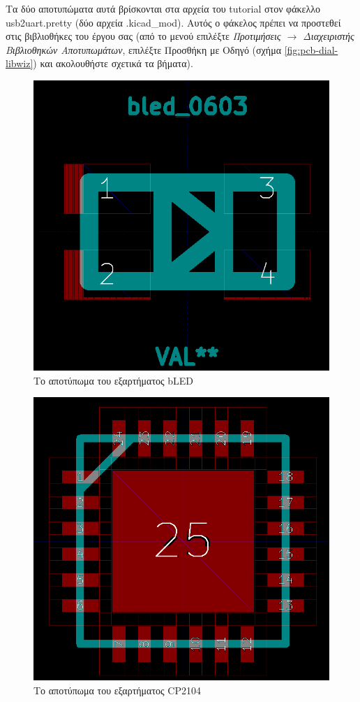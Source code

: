 \documentclass[a4paper]{article}
\begin{document}
Τα δύο αποτυπώματα αυτά βρίσκονται στα αρχεία του tutorial στον φάκελλο usb2uart.pretty (δύο αρχεία .kicad\_mod). Αυτός ο φάκελος πρέπει να προστεθεί στις βιβλιοθήκες του έργου σας (από το μενού επιλέξτε \textit{Προτιμήσεις $\rightarrow$ Διαχειριστής Βιβλιοθηκών Αποτυπωμάτων}, επιλέξτε Προσθήκη με Οδηγό (σχήμα \ref{fig:pcb-dial-libwiz}) και ακολουθήστε σχετικά τα βήματα).

\begin{figure}
  \begin{center}
    \includegraphics[width=.5\textwidth]{img/footed-circ-bled.png}
    \caption{Το αποτύπωμα του εξαρτήματος bLED}
    \label{fig:footed-circ-bled}
  \end{center}
\end{figure}

\begin{figure}
  \begin{center}
    \includegraphics[width=.5\textwidth]{img/footed-circ-cp}
    \caption{Το αποτύπωμα του εξαρτήματος CP2104}
    \label{fig:footed-circ-cp}
  \end{center}
\end{figure}

\end{document}
